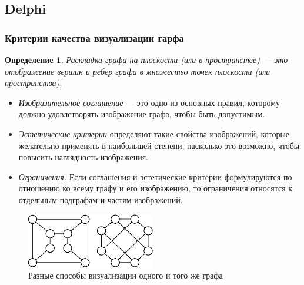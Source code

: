 \documentclass{beamer}
\begin{document}
\subsection{Delphi}
\begin{frame}
\frametitle{Критерии качества визуализации гарфа}
\tiny{
	\newtheorem{vis}{Определение}
	\begin{vis}
	Раскладка графа на плоскости (или в пространстве) — это отображение вершин и ребер графа в множество точек плоскости (или пространства). 
	\end{vis}
	
	\begin{itemize}
	\item \textit{Изобразительное соглашение} — это одно из основных правил, которому должно удовлетворять изображение графа, чтобы быть допустимым.

	\item \textit{Эстетические критерии} определяют такие свойства изображений, которые желательно применять в наибольшей степени, насколько это возможно, чтобы повысить наглядность изображения. 

	\item \textit{Ограничения.} Если соглашения и эстетические критерии формулируются по отношению ко всему графу и его изображению, то ограничения относятся к отдельным подграфам и частям изображений.
\end{itemize}

	\begin{figure}[htbp]
		\centering
			\includegraphics[width=0.50\textwidth]{Pic/Pic1.eps}
		\caption{Разные способы визуализации одного и того же графа}
		\label{fig:VisExample}
	\end{figure}
}
\end{frame}

\end{document}
